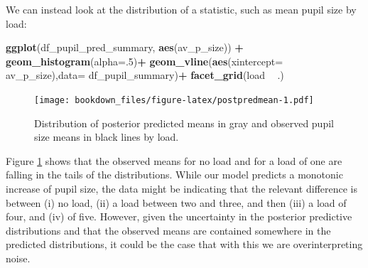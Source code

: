 \documentclass[12pt,]{krantz}
\newenvironment{Shaded}{\begin{snugshade}}{\end{snugshade}}
\newcommand{\CommentTok}[1]{\textcolor[rgb]{0.56,0.35,0.01}{\textit{#1}}}
\newcommand{\DataTypeTok}[1]{\textcolor[rgb]{0.13,0.29,0.53}{#1}}
\newcommand{\DecValTok}[1]{\textcolor[rgb]{0.00,0.00,0.81}{#1}}
\newcommand{\KeywordTok}[1]{\textcolor[rgb]{0.13,0.29,0.53}{\textbf{#1}}}
\newcommand{\NormalTok}[1]{#1}
\newcommand{\OperatorTok}[1]{\textcolor[rgb]{0.81,0.36,0.00}{\textbf{#1}}}
\newcommand{\StringTok}[1]{\textcolor[rgb]{0.31,0.60,0.02}{#1}}
\theoremstyle{definition}
\theoremstyle{definition}
\theoremstyle{definition}
\theoremstyle{remark}
\begin{document}
We can instead look at the distribution of a statistic, such as mean pupil size by load:

\begin{Shaded}
\end{Shaded}



\begin{Shaded}
\begin{Highlighting}[]
\KeywordTok{ggplot}\NormalTok{(df_pupil_pred_summary, }\KeywordTok{aes}\NormalTok{(av_p_size)) }\OperatorTok{+}
\StringTok{    }\KeywordTok{geom_histogram}\NormalTok{(}\DataTypeTok{alpha=}\NormalTok{.}\DecValTok{5}\NormalTok{)}\OperatorTok{+}
\StringTok{    }\KeywordTok{geom_vline}\NormalTok{(}\KeywordTok{aes}\NormalTok{(}\DataTypeTok{xintercept=}\NormalTok{ av_p_size),}\DataTypeTok{data=}\NormalTok{ df_pupil_summary)}\OperatorTok{+}
\StringTok{    }\KeywordTok{facet_grid}\NormalTok{(load }\OperatorTok{~}\StringTok{ }\NormalTok{.)}
\end{Highlighting}
\end{Shaded}

\begin{figure}
\centering
\texttt{[image: bookdown\_files/figure-latex/postpredmean-1.pdf]}
\caption{\label{fig:postpredmean}Distribution of posterior predicted means in gray and observed pupil size means in black lines by load.}
\end{figure}

Figure \ref{fig:postpredmean} shows that the observed means for no load and for a load of one are falling in the tails of the distributions. While our model predicts a monotonic increase of pupil size, the data might be indicating that the relevant difference is between (i) no load, (ii) a load between two and three, and then (iii) a load of four, and (iv) of five. However, given the uncertainty in the posterior predictive distributions and that the observed means are contained somewhere in the predicted distributions, it could be the case that with this we are overinterpreting noise.
\end{document}
